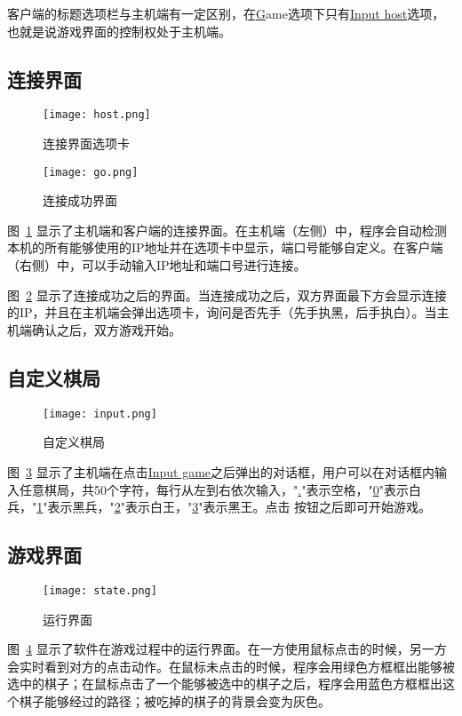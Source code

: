 \documentclass[a4paper]{article}
\begin{document}
客户端的标题选项栏与主机端有一定区别，在\uline{G}ame选项下只有\uline{Input host}选项，也就是说游戏界面的控制权处于主机端。

\subsection{连接界面}
\begin{figure}[htp]
\centering
\texttt{[image: host.png]}
\caption{连接界面选项卡}
\label{fig:host}
\end{figure}

\begin{figure}[htp]
\centering
\texttt{[image: go.png]}
\caption{连接成功界面}
\label{fig:go}
\end{figure}


图~\ref{fig:host} 显示了主机端和客户端的连接界面。在主机端（左侧）中，程序会自动检测本机的所有能够使用的IP地址并在选项卡中显示，端口号能够自定义。在客户端（右侧）中，可以手动输入IP地址和端口号进行连接。

图~\ref{fig:go} 显示了连接成功之后的界面。当连接成功之后，双方界面最下方会显示连接的IP，并且在主机端会弹出选项卡，询问是否先手（先手执黑，后手执白）。当主机端确认之后，双方游戏开始。

\subsection{自定义棋局}
\begin{figure}[htp]
\centering
\texttt{[image: input.png]}
\caption{自定义棋局}
\label{fig:custom}
\end{figure}

图~\ref{fig:custom} 显示了主机端在点击\uline{Input game}之后弹出的对话框，用户可以在对话框内输入任意棋局，共50个字符，每行从左到右依次输入，"\uline{.}"表示空格，"\uline{0}"表示白兵，"\uline{1}"表示黑兵，"\uline{2}"表示白王，"\uline{3}"表示黑王。点击  按钮之后即可开始游戏。

\subsection{游戏界面}
\begin{figure}[htp]
\centering
\texttt{[image: state.png]}
\caption{运行界面}
\label{fig:status}
\end{figure}

图~\ref{fig:status} 显示了软件在游戏过程中的运行界面。在一方使用鼠标点击的时候，另一方会实时看到对方的点击动作。在鼠标未点击的时候，程序会用绿色方框框出能够被选中的棋子；在鼠标点击了一个能够被选中的棋子之后，程序会用蓝色方框框出这个棋子能够经过的路径；被吃掉的棋子的背景会变为灰色。
\end{document}
